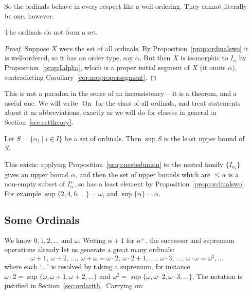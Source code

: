 \documentclass[a4paper]{scrartcl}
\newcommand{\on}{\operatorname{On}}
\begin{document}
So the ordinals behave in every respect like a well-ordering. They cannot literally be one, however.

\begin{theorem}
  The ordinals do not form a set.
\end{theorem}
\begin{proof}
  Suppose $X$ were the set of all ordinals. By Proposition~\ref{prop:ordinalswo} it is well-ordered, so it has an order type, say $\alpha$. But then $X$ is isomorphic to $I_\alpha$ by Proposition~\ref{prop:Ialpha}, which is a proper initial segment of $X$ (it omits $\alpha$), contradicting Corollary~\ref{cor:notpropersegment}.
\end{proof}

This is not a paradox in the sense of an inconsistency -- it is a theorem, and a useful one. We will write $\on$ for the class of all ordinals, and treat statements about it as abbreviations, exactly as we will do for classes in general in Section~\ref{sec:settheory}.

\begin{definition}[Supremum]
  Let $S = \{\alpha_i \mid i \in I\}$ be a set of ordinals. Then $\sup S$ is the least upper bound of $S$.
\end{definition}

This exists: applying Proposition~\ref{prop:nestedunion} to the nested family $\{I_{\alpha_i}\}$ gives an upper bound $\alpha$, and then the set of upper bounds which are $\leq \alpha$ is a non-empty subset of $I_{\alpha}^+$, so has a least element by Proposition~\ref{prop:ordinalswo}. For example $\sup\{2, 4, 6, \dots\} = \omega$, and $\sup\{\alpha\} = \alpha$.

\subsection{Some Ordinals}

We know $0, 1, 2, \dots$ and $\omega$. Writing $\alpha + 1$ for $\alpha^+$, the successor and supremum operations already let us generate a great many ordinals:
$$\omega + 1, \, \omega+2, \, \dots, \, \omega + \omega = \omega \cdot 2, \, \omega\cdot 2 + 1, \, \dots, \, \omega \cdot 3, \, \dots, \, \omega \cdot \omega = \omega^2, \dots$$
where each `$\dots$' is resolved by taking a supremum, for instance $\omega \cdot 2 = \sup\{\omega, \omega + 1, \omega + 2, \dots\}$ and $\omega^2 = \sup\{\omega, \omega\cdot 2, \omega \cdot 3, \dots\}$. The notation is justified in Section~\ref{sec:ordarith}. Carrying on:
\end{document}
